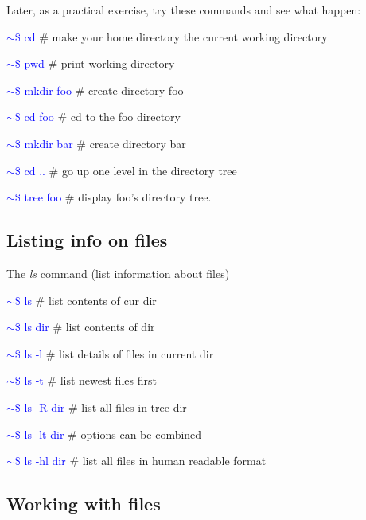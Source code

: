 \documentclass{beamer}[10pt, usepdftitle=false, handout]
\newcommand*{\blue}{\textcolor{blue}}
\begin{document}
	\begin{frame}
	
	Later, as a practical exercise, try these commands and see what happen:
	\vspace*{1em}
	
	\blue{$\sim$\$ cd} \# make your home directory the current working directory
	
	\blue{$\sim$\$ pwd} \# print working directory
	
	\blue{$\sim$\$ mkdir foo} \# create directory foo
	
	\blue{$\sim$\$ cd foo} \# cd to the foo directory
	
	\blue{$\sim$\$ mkdir bar} \# create directory bar

	\blue{$\sim$\$ cd ..} \# go up one level in the directory tree
	
	\blue{$\sim$\$ tree foo} \# display foo’s directory tree.

	\end{frame}	

	\subsection{Listing info on files}
	
	\begin{frame}
	
	The \textit{ls} command (list information about files)
	\vspace*{1em}
	
	\blue{$\sim$\$ ls} \# list contents of cur dir
	
	\blue{$\sim$\$ ls dir} \# list contents of dir
	
	\blue{$\sim$\$ ls ‐l} \# list details of files in current dir 
	
	\blue{$\sim$\$ ls ‐t} \# list newest files first
	
	\blue{$\sim$\$ ls ‐R dir} \# list all files in tree dir
	
	\blue{$\sim$\$ ls ‐lt dir} \# options can be combined
	
	\blue{$\sim$\$ ls ‐hl dir} \# list all files in human readable
format
	
	\end{frame}
		
	\subsection{Working with files}		
		
\end{document}
